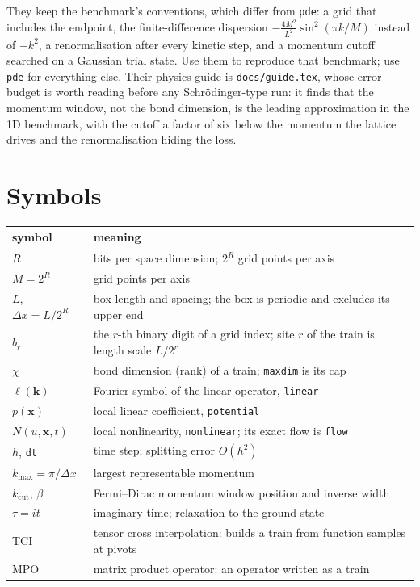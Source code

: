\documentclass[11pt,a4paper]{article}
\newcommand{\code}[1]{\texttt{#1}}
\newcommand{\kcut}{k_{\mathrm{cut}}}
\newcommand{\kmax}{k_{\max}}
\newcommand{\vx}{\mathbf{x}}
\newcommand{\vk}{\mathbf{k}}
\begin{document}
They keep the benchmark's conventions, which differ from \code{pde}: a grid that
includes the endpoint, the finite-difference dispersion
$-\frac{4M^2}{L^2}\sin^2(\pi k/M)$ instead of $-k^2$, a renormalisation after every
kinetic step, and a momentum cutoff searched on a Gaussian trial state. Use them to
reproduce that benchmark; use \code{pde} for everything else. Their physics guide is
\code{docs/guide.tex}, whose error budget is worth reading before any Schr\"odinger-type
run: it finds that the momentum window, not the bond dimension, is the leading
approximation in the 1D benchmark, with the cutoff a factor of six below the momentum
the lattice drives and the renormalisation hiding the loss.

\section{Symbols}

\begin{tabularx}{\textwidth}{@{}lL@{}}
\toprule
symbol & meaning \\
\midrule
$R$ & bits per space dimension; $2^R$ grid points per axis \\
$M=2^R$ & grid points per axis \\
$L$, $\Delta x=L/2^R$ & box length and spacing; the box is periodic and excludes its upper end \\
$b_r$ & the $r$-th binary digit of a grid index; site $r$ of the train is length scale $L/2^r$ \\
$\chi$ & bond dimension (rank) of a train; \code{maxdim} is its cap \\
$\ell(\vk)$ & Fourier symbol of the linear operator, \code{linear} \\
$p(\vx)$ & local linear coefficient, \code{potential} \\
$N(u,\vx,t)$ & local nonlinearity, \code{nonlinear}; its exact flow is \code{flow} \\
$h$, \code{dt} & time step; splitting error $O(h^2)$ \\
$\kmax=\pi/\Delta x$ & largest representable momentum \\
$\kcut$, $\beta$ & Fermi--Dirac momentum window position and inverse width \\
$\tau=it$ & imaginary time; relaxation to the ground state \\
TCI & tensor cross interpolation: builds a train from function samples at pivots \\
MPO & matrix product operator: an operator written as a train \\
\bottomrule
\end{tabularx}
\end{document}
